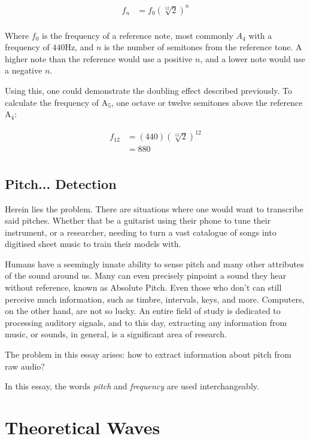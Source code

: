 \documentclass{article}
\begin{document}
\begin{align*}
    f_n & = f_0 (\sqrt[12]{2})^n \\
\end{align*}

Where $f_0$ is the frequency of a reference note, most commonly $A_4$ with a frequency of $440$Hz, and $n$ is the number of semitones from the reference tone. A higher note than the reference would use a positive $n$, and a lower note would use a negative $n$.

Using this, one could demonstrate the doubling effect described previously. To calculate the frequency of A$_5$, one octave or twelve semitones above the reference A$_4$:

\begin{align*}
    f_{12} & = (440) (\sqrt[12]{2})^{12} \\
    & = 880 \\
\end{align*}

\subsection{Pitch... Detection}

Herein lies the problem. There are situations where one would want to transcribe said pitches. Whether that be a guitarist using their phone to tune their instrument, or a researcher, needing to turn a vast catalogue of songs into digitised sheet music to train their models with.

Humans have a seemingly innate ability to sense pitch and many other attributes of the sound around us\cite{Oxenham2012PitchPerception}. Many can even precisely pinpoint a sound they hear without reference, known as Absolute Pitch. Even those who don't can still perceive much information, such as timbre, intervals, keys, and more\cite{Deutsch2013AbsolutePitch}. Computers, on the other hand, are not so lucky. An entire field of study is dedicated to processing auditory signals, and to this day, extracting any information from music, or sounds, in general, is a significant area of research.

The problem in this essay arises: how to extract information about pitch from raw audio?

In this essay, the words \emph{pitch} and \emph{frequency} are used interchangeably.

\section{Theoretical Waves}
\end{document}

